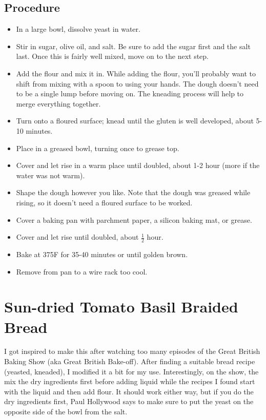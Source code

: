 \documentclass[10pt, openany]{book}
\begin{document}
\subsection{Procedure}
\begin{itemize}
  \item In a large bowl, dissolve yeast in water.
  \item Stir in sugar, olive oil, and salt.  Be sure to add the sugar first and the salt last.  Once this is fairly well mixed, move on to the next step.
  \item Add the flour and mix it in.  While adding the flour, you'll probably want to shift from mixing with a spoon to using your hands.  The dough doesn't need to be a single lump before moving on.  The kneading process will help to merge everything together.
  \item Turn onto a floured surface; knead until the gluten is well developed, about 5-10 minutes.
  \item Place in a greased bowl, turning once to grease top.
  \item Cover and let rise in a warm place until doubled, about 1-2 hour (more if the water was not warm).
  \item Shape the dough however you like.  Note that the dough was greased while rising, so it doesn't need a floured surface to be worked.
  \item Cover a baking pan with parchment paper, a silicon baking mat, or grease.
  \item Cover and let rise until doubled, about $\frac{1}{2}$ hour.
  \item Bake at 375\degree{}F for 35-40 minutes or until golden brown.
  \item Remove from pan to a wire rack too cool.
\end{itemize}

\section{Sun-dried Tomato Basil Braided Bread}
\label{bread:SundriedTomatoBasil}
I got inspired to make this after watching too many episodes of the Great British Baking Show (aka Great British Bake-off).  After finding a suitable bread recipe (yeasted, kneaded), I modified it a bit for my use.  Interestingly, on the show, the mix the dry ingredients first before adding liquid while the recipes I found start with the liquid and then add flour.  It should work either way, but if you do the dry ingredients first, Paul Hollywood says to make sure to put the yeast on the opposite side of the bowl from the salt.
\end{document}
